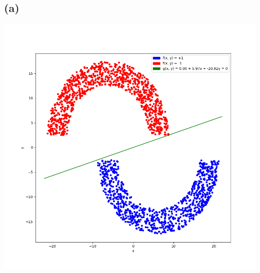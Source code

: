 \documentclass{article}
\begin{document}
	\subsection*{(a)}
		\includegraphics[scale=0.38]{p3.1a.png}
\end{document}
